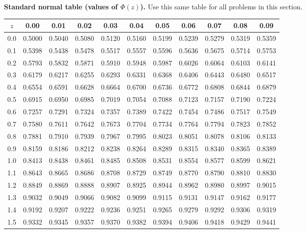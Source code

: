 	\noindent\textbf{Standard normal table (values of \(\Phi(z)\)).} Use this same table for all problems in this section.
	\begin{center}
		\begin{tabular}{c|cccccccccc}
			\toprule
			$z$ & 0.00 & 0.01 & 0.02 & 0.03 & 0.04 & 0.05 & 0.06 & 0.07 & 0.08 & 0.09 \\
			\midrule
			0.0 & 0.5000 & 0.5040 & 0.5080 & 0.5120 & 0.5160 & 0.5199 & 0.5239 & 0.5279 & 0.5319 & 0.5359 \\
			0.1 & 0.5398 & 0.5438 & 0.5478 & 0.5517 & 0.5557 & 0.5596 & 0.5636 & 0.5675 & 0.5714 & 0.5753 \\
			0.2 & 0.5793 & 0.5832 & 0.5871 & 0.5910 & 0.5948 & 0.5987 & 0.6026 & 0.6064 & 0.6103 & 0.6141 \\
			0.3 & 0.6179 & 0.6217 & 0.6255 & 0.6293 & 0.6331 & 0.6368 & 0.6406 & 0.6443 & 0.6480 & 0.6517 \\
			0.4 & 0.6554 & 0.6591 & 0.6628 & 0.6664 & 0.6700 & 0.6736 & 0.6772 & 0.6808 & 0.6844 & 0.6879 \\
			0.5 & 0.6915 & 0.6950 & 0.6985 & 0.7019 & 0.7054 & 0.7088 & 0.7123 & 0.7157 & 0.7190 & 0.7224 \\
			0.6 & 0.7257 & 0.7291 & 0.7324 & 0.7357 & 0.7389 & 0.7422 & 0.7454 & 0.7486 & 0.7517 & 0.7549 \\
			0.7 & 0.7580 & 0.7611 & 0.7642 & 0.7673 & 0.7704 & 0.7734 & 0.7764 & 0.7794 & 0.7823 & 0.7852 \\
			0.8 & 0.7881 & 0.7910 & 0.7939 & 0.7967 & 0.7995 & 0.8023 & 0.8051 & 0.8078 & 0.8106 & 0.8133 \\
			0.9 & 0.8159 & 0.8186 & 0.8212 & 0.8238 & 0.8264 & 0.8289 & 0.8315 & 0.8340 & 0.8365 & 0.8389 \\
			1.0 & 0.8413 & 0.8438 & 0.8461 & 0.8485 & 0.8508 & 0.8531 & 0.8554 & 0.8577 & 0.8599 & 0.8621 \\
			1.1 & 0.8643 & 0.8665 & 0.8686 & 0.8708 & 0.8729 & 0.8749 & 0.8770 & 0.8790 & 0.8810 & 0.8830 \\
			1.2 & 0.8849 & 0.8869 & 0.8888 & 0.8907 & 0.8925 & 0.8944 & 0.8962 & 0.8980 & 0.8997 & 0.9015 \\
			1.3 & 0.9032 & 0.9049 & 0.9066 & 0.9082 & 0.9099 & 0.9115 & 0.9131 & 0.9147 & 0.9162 & 0.9177 \\
			1.4 & 0.9192 & 0.9207 & 0.9222 & 0.9236 & 0.9251 & 0.9265 & 0.9279 & 0.9292 & 0.9306 & 0.9319 \\
			1.5 & 0.9332 & 0.9345 & 0.9357 & 0.9370 & 0.9382 & 0.9394 & 0.9406 & 0.9418 & 0.9429 & 0.9441 \\

\end{tabular}
\end{center}
